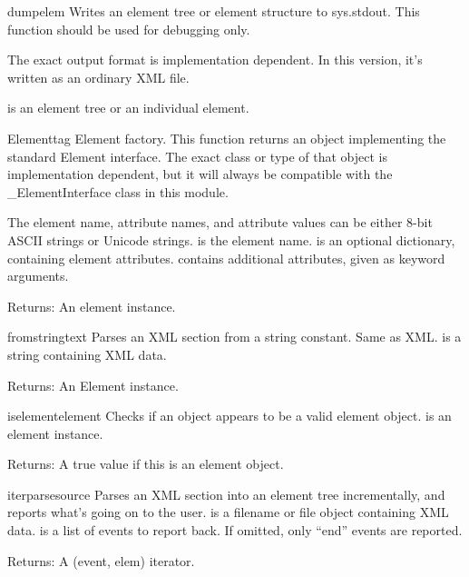 \begin{funcdesc}{dump}{elem}
Writes an element tree or element structure to sys.stdout.  This
function should be used for debugging only.

The exact output format is implementation dependent.  In this
version, it's written as an ordinary XML file.

 is an element tree or an individual element.
\end{funcdesc}

\begin{funcdesc}{Element}{tag}
Element factory.  This function returns an object implementing the
standard Element interface.  The exact class or type of that object
is implementation dependent, but it will always be compatible with
the {\_}ElementInterface class in this module.

The element name, attribute names, and attribute values can be
either 8-bit ASCII strings or Unicode strings.
 is the element name.
 is an optional dictionary, containing element attributes.
 contains additional attributes, given as keyword arguments.

\begin{datadescni}{Returns:}
An element instance.
\end{datadescni}
\end{funcdesc}

\begin{funcdesc}{fromstring}{text}
Parses an XML section from a string constant.  Same as XML.
 is a string containing XML data.

\begin{datadescni}{Returns:}
An Element instance.
\end{datadescni}
\end{funcdesc}

\begin{funcdesc}{iselement}{element}
Checks if an object appears to be a valid element object.
 is an element instance.

\begin{datadescni}{Returns:}
A true value if this is an element object.
\end{datadescni}
\end{funcdesc}

\begin{funcdesc}{iterparse}{source}
Parses an XML section into an element tree incrementally, and reports
what's going on to the user.
 is a filename or file object containing XML data.
 is a list of events to report back.  If omitted, only ``end''
events are reported.

\begin{datadescni}{Returns:}
A (event, elem) iterator.
\end{datadescni}
\end{funcdesc}

